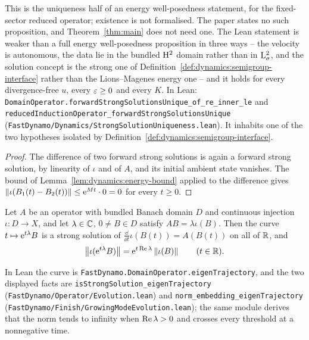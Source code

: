 This is the uniqueness half of an energy well-posedness statement, for the
fixed-sector reduced operator; existence is not formalised.  The paper states no such
proposition, and Theorem~\ref{thm:main} does not need one.  The Lean statement is weaker
than a full energy well-posedness proposition in three ways -- the velocity is
autonomous, the data lie in the bundled $\mathrm{H}^2 $ domain rather than in $\mathrm{L}^2_\sigma $, and
the solution concept is the strong one of Definition~\ref{def:dynamics:semigroup-interface}
rather than the Lions--Magenes energy one -- and it holds for every divergence-free $u $, every
$\varepsilon\geq0 $ and every $K $.  In Lean:
\texttt{DomainOperator.forwardStrongSolutionsUnique\_of\_re\_inner\_le} and
\texttt{reducedInductionOperator\_forwardStrongSolutionsUnique}
(\texttt{FastDynamo/Dynamics/StrongSolutionUniqueness.lean}).  It inhabits one of the two hypotheses isolated by
Definition~\ref{def:dynamics:semigroup-interface}.

\begin{proof}
  \leanok
  The difference of two forward strong solutions is again a forward strong solution, by
  linearity of $\iota $ and of $A $, and its initial ambient state vanishes.  The bound of
  Lemma~\ref{lem:dynamics:energy-bound} applied to the difference gives
  $\left\|\iota(B_1(t)-B_2(t))\right\|\leq\mathrm{e}^{Mt}\cdot0=0 $ for every $t\geq0 $.
\end{proof}

\begin{lemma}
  \label{lem:dynamics:eigen-trajectory-law}
  \leanok
  Let $A $ be an operator with bundled Banach domain $D $ and continuous injection
  $\iota:D\to X $, and let $\lambda\in\mathbb{C} $, $0\neq B\in D $ satisfy $AB=\lambda\iota(B) $.
  Then the curve $t\mapsto\mathrm{e}^{t\lambda}B $ is a strong solution of
  $\frac{\dd}{\dd t}\iota(B(t))=A(B(t)) $ on all of $\mathbb{R} $, and
  \[
    \left\|\iota(\mathrm{e}^{t\lambda}B)\right\|
    =\mathrm{e}^{t\operatorname{Re}\lambda}\left\|\iota(B)\right\|
    \qquad(t\in\mathbb{R}).
  \]
\end{lemma}

In Lean the curve is \texttt{FastDynamo.DomainOperator.eigenTrajectory}, and the two
displayed facts are \texttt{isStrongSolution\_eigenTrajectory}
(\texttt{FastDynamo/Operator/Evolution.lean}) and
\texttt{norm\_embedding\_eigenTrajectory}
(\texttt{FastDynamo/Finish/GrowingModeEvolution.lean}); the same module derives that the
norm tends to infinity when $\operatorname{Re}\lambda>0 $ and crosses every threshold at a nonnegative
time.

